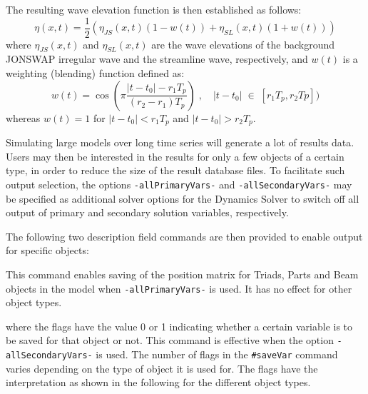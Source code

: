 \noindent
The resulting wave elevation function is then established as follows:
$$
\eta(x,t) = \frac{1}{2}\left(\eta_{JS}(x,t)(1-w(t))+\eta_{SL}(x,t)(1+w(t))\right)
$$
where $\eta_{JS}(x,t)$ and $\eta_{SL}(x,t)$ are the wave elevations of the
background JONSWAP irregular wave and the streamline wave, respectively,
and $w(t)$ is a weighting (blending) function defined as:
$$
w(t) = \cos\left(\pi\frac{|t-t_0|-r_1 T_p}{(r_2-r_1)T_p}\right)
\;,\quad |t-t_0| \;\in\; [r_1T_p,r_2 Tp])
$$
whereas $w(t)=1$ for $|t-t_0|<r_1T_p$ and $|t-t_0|>r_2T_p$.



Simulating large models over long time series will generate a lot of
results data. Users may then be interested in the results for only a few
objects of a certain type, in order to reduce the size of the result
database files. To facilitate such output selection, the options
{\tt-allPrimaryVars-} and {\tt-allSecondaryVars-} may be specified
as additional solver options for the Dynamics Solver
 to switch off
all output of primary and secondary solution variables, respectively.

The following two description field commands are then provided to enable
output for specific objects:


\noindent
This command enables saving of the position matrix for Triads, Parts and
Beam objects in the model when {\tt-allPrimaryVars-} is used.
It has no effect for other object types.


\noindent
where the {\tt{}} flags have the value 0 or 1 indicating whether
a certain variable is to be saved for that object or not.
This command is effective when the option {\tt-allSecondaryVars-} is used.
The number of flags in the {\tt\#saveVar} command varies depending on the type
of object it is used for. The flags have the interpretation as shown in the
following for the different object types.




